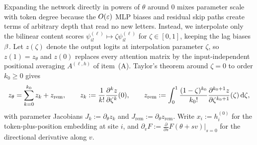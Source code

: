 Expanding the network directly in powers of $\theta$ around $0$ mixes parameter scale with token degree because the $O(\varepsilon)$ MLP biases and residual skip paths create terms of arbitrary depth that read no new letters. Instead, we interpolate only the bilinear content scores $\psi_{il}^{(\ell)} \mapsto \zeta\psi_{il}^{(\ell)}$ for $\zeta \in [0,1]$, keeping the lag biases $\beta$. Let $z(\zeta)$ denote the output logits at interpolation parameter $\zeta$, so $z(1) = z_\theta$ and $z(0)$ replaces every attention matrix by the input-independent positional averaging $A^{(\ell,h)}$ of item~(A). Taylor's theorem around $\zeta = 0$ to order $k_0 \ge 0$ gives
\begin{equation}
 z_\theta = \sum_{k=0}^{k_0} z_k + z_{\mathrm{rem}}, \qquad
 z_k := \frac{1}{k!}\frac{\partial^k z}{\partial\zeta^k}(0), \qquad
 z_{\mathrm{rem}} := \int_0^1 \frac{(1 - \zeta)^{k_0}}{k_0!}\frac{\partial^{k_0+1} z}{\partial\zeta^{k_0+1}}(\zeta)\,\mathrm{d}\zeta,
 \label{eq:score-split}
\end{equation}
with parameter Jacobians $J_k := \partial_\theta z_k$ and $J_{\mathrm{rem}} := \partial_\theta z_{\mathrm{rem}}$. Write $x_i := h_i^{(0)}$ for the token-plus-position embedding at site $i$, and $\partial_v F := \frac{\partial}{\partial s}F(\theta + sv)\big|_{s=0}$ for the directional derivative along $v$.

